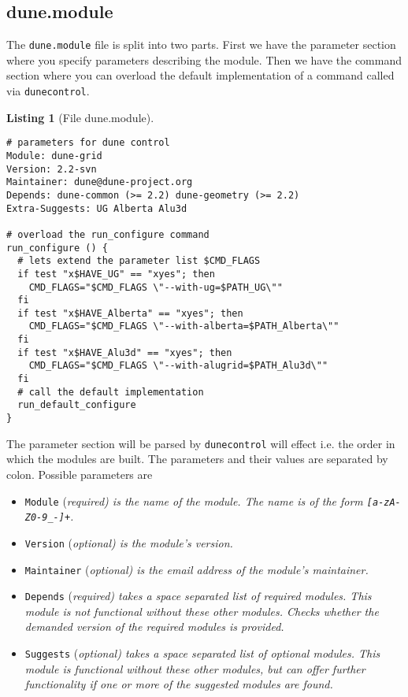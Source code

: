 \documentclass[11pt,a4paper,headinclude,footinclude,DIV16,normalheadings]{scrartcl}
\newtheorem{lst}{Listing}
\newcommand{\dunecontrol}{\texttt{dunecontrol}\xspace}
\newcommand{\dunemodule}{\texttt{dune.module}\xspace}
\begin{document}
\subsection{dune.module}\label{subsec::dune.module}

The \dunemodule file is split into two parts. First we have the
parameter section where you specify parameters describing the module.
Then we have the command section where you can overload the default
implementation of a command called via \dunecontrol.

\begin{lst}[File dune.module] \mbox{}
\begin{lstlisting}
# parameters for dune control
Module: dune-grid
Version: 2.2-svn
Maintainer: dune@dune-project.org
Depends: dune-common (>= 2.2) dune-geometry (>= 2.2)
Extra-Suggests: UG Alberta Alu3d

# overload the run_configure command
run_configure () {
  # lets extend the parameter list $CMD_FLAGS
  if test "x$HAVE_UG" == "xyes"; then
    CMD_FLAGS="$CMD_FLAGS \"--with-ug=$PATH_UG\""
  fi
  if test "x$HAVE_Alberta" == "xyes"; then
    CMD_FLAGS="$CMD_FLAGS \"--with-alberta=$PATH_Alberta\""
  fi  
  if test "x$HAVE_Alu3d" == "xyes"; then
    CMD_FLAGS="$CMD_FLAGS \"--with-alugrid=$PATH_Alu3d\""
  fi
  # call the default implementation
  run_default_configure
}
\end{lstlisting}
\end{lst}

The parameter section will be parsed by \dunecontrol will effect
i.e. the order in which the modules are built. The parameters and
their values are separated by colon. Possible parameters are
\begin{itemize}
\item \texttt{Module} (\em required\em) is the name of the module. The
  name is of the form \texttt{[a-zA-Z0-9\_-]+}.
\item \texttt{Version} (\em optional\em) is the module's version.
\item \texttt{Maintainer} (\em optional\em) is the email address of the 
  module's maintainer.
\item \texttt{Depends} (\em required\em) takes a space separated list
  of required modules. This module is not functional without these
  other modules. Checks whether the demanded version of the required
  modules is provided.
\item \texttt{Suggests} (\em optional\em) takes a space separated list
  of optional modules. This module is functional without these
  other modules, but can offer further functionality if one or more of
  the suggested modules are found.
\end{itemize}
\end{document}
